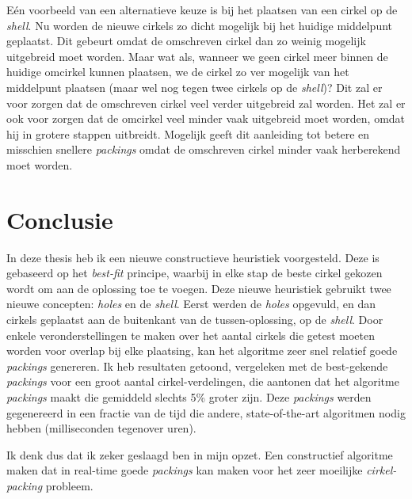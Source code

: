 \documentclass[12pt,a4paper,oneside]{book}
\begin{document}
{Eén voorbeeld van een alternatieve keuze is bij het plaatsen van een cirkel op de \textit{shell}.
Nu worden de nieuwe cirkels zo dicht mogelijk bij het huidige middelpunt geplaatst.
Dit gebeurt omdat de omschreven cirkel dan zo weinig mogelijk uitgebreid moet worden.
Maar wat als, wanneer we geen cirkel meer binnen de huidige omcirkel kunnen plaatsen, we de cirkel zo ver mogelijk van het middelpunt plaatsen (maar wel nog tegen twee cirkels op de \textit{shell})?
Dit zal er voor zorgen dat de omschreven cirkel veel verder uitgebreid zal worden.
Het zal er ook voor zorgen dat de omcirkel veel minder vaak uitgebreid moet worden, omdat hij in grotere stappen uitbreidt.
Mogelijk geeft dit aanleiding tot betere en misschien snellere \textit{packings} omdat de omschreven cirkel minder vaak herberekend moet worden.

\chapter{Conclusie} \label{chap:conclusie}

In deze thesis heb ik een nieuwe constructieve heuristiek voorgesteld.
Deze is gebaseerd op het \textit{best-fit} principe, waarbij in elke stap de beste cirkel gekozen wordt om aan de oplossing toe te voegen.
Deze nieuwe heuristiek gebruikt twee nieuwe concepten: \textit{holes} en de \textit{shell}.
Eerst werden de \textit{holes} opgevuld, en dan cirkels geplaatst aan de buitenkant van de tussen-oplossing, op de \textit{shell}.
Door enkele veronderstellingen te maken over het aantal cirkels die getest moeten worden voor overlap bij elke plaatsing, kan het algoritme zeer snel relatief goede \textit{packings} genereren.
Ik heb resultaten getoond, vergeleken met de best-gekende \textit{packings} voor een groot aantal cirkel-verdelingen, die aantonen dat het algoritme \textit{packings} maakt die gemiddeld slechts 5\% groter zijn. %
Deze \textit{packings} werden gegenereerd in een fractie van de tijd die andere, state-of-the-art algoritmen nodig hebben (milliseconden tegenover uren).


Ik denk dus dat ik zeker geslaagd ben in mijn opzet.
Een constructief algoritme maken dat in real-time goede \textit{packings} kan maken voor het zeer moeilijke \textit{cirkel-packing} probleem.

}
\end{document}
